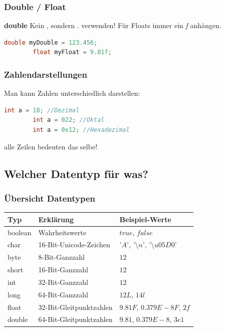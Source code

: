 \documentclass[18pt]{beamer}
\begin{document}

\begin{frame}[fragile]
	\frametitle{Double / Float}
	
	\textbf{double}
	Kein , sondern . verwenden! Für Floats immer ein \emph{f} anhängen.
	\begin{lstlisting}[language=java]
		double myDouble = 123.456;
		float myFloat = 9.81f;
	\end{lstlisting}
\end{frame}


\begin{frame}[fragile]
	\frametitle{Zahlendarstellungen}
	
	Man kann Zahlen unterschiedlich darstellen:
	\begin{lstlisting}[language=java]
		int a = 18; //Dezimal
		int a = 022; //Oktal
		int a = 0x12; //Hexadezimal
	\end{lstlisting}
	alle Zeilen bedeuten das selbe!
\end{frame}

\subsection{Welcher Datentyp für was?}
\begin{frame}[fragile]
	\frametitle{Übersicht Datentypen}
	\begin{tabular}[ht]{|l|l|l|}
		\hline
		\textbf{Typ}&	\textbf{Erklärung}		&	\textbf{Beispiel-Werte}								 \\
		\hline
		boolean 	&	Wahrheitswerte 			&	$true$, $false$										 \\
		char 		&	16-Bit-Unicode-Zeichen 	&	$’A’$, ’\textbackslash $n$', ’\textbackslash $u05D0$’	 \\
		byte 		&	8-Bit-Ganzzahl			& 	$12$												 \\
		short 		&	16-Bit-Ganzzahl 		&	$12$												 \\
		int 		&	32-Bit-Ganzzahl			& 	$12$												 \\
		long 		&	64-Bit-Ganzzahl			& 	$12L$, $14l$										 \\
		float 		&	32-Bit-Gleitpunktzahlen &	$9.81F$, $0.379E-8F$, $2f$							 \\
		double 		&	64-Bit-Gleitpunktzahlen &	$9.81$, $0.379E-8$, $3e1$								 \\
		\hline
	\end{tabular}

\end{frame}
\end{document}
